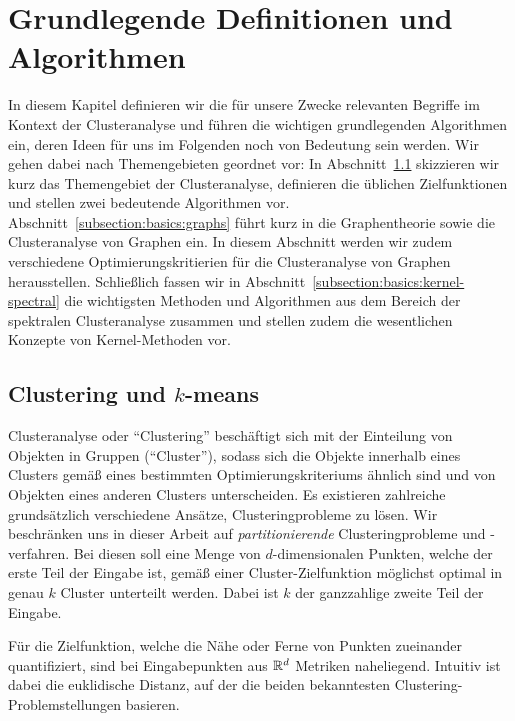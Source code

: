 \section{Grundlegende Definitionen und Algorithmen}
\label{section:basics}

In diesem Kapitel definieren wir die für unsere Zwecke relevanten Begriffe im Kontext der Clusteranalyse und führen die
wichtigen grundlegenden Algorithmen ein, deren Ideen für uns im Folgenden noch von Bedeutung sein werden. Wir gehen dabei
nach Themengebieten geordnet vor: In Abschnitt~\ref{subsection:basics:clustering} skizzieren wir kurz das
Themengebiet der Clusteranalyse, definieren die üblichen Zielfunktionen und stellen zwei bedeutende Algorithmen vor.
Abschnitt~\ref{subsection:basics:graphs} führt kurz in die Graphentheorie sowie die Clusteranalyse von Graphen ein. In diesem
Abschnitt werden wir zudem verschiedene Optimierungskritierien für die
Clusteranalyse von Graphen herausstellen. Schließlich fassen wir in Abschnitt~\ref{subsection:basics:kernel-spectral} die
wichtigsten Methoden und Algorithmen aus dem Bereich der spektralen Clusteranalyse zusammen und stellen zudem die wesentlichen
Konzepte von Kernel-Methoden vor.

\subsection{Clustering und \texorpdfstring{$k$}{k}-means}
\label{subsection:basics:clustering}

Clusteranalyse oder "`Clustering"' beschäftigt sich mit der Einteilung von Objekten in Gruppen ("`Cluster"'), sodass
sich die Objekte innerhalb eines Clusters gemäß eines bestimmten Optimierungskriteriums ähnlich sind und von Objekten eines
anderen Clusters unterscheiden. Es existieren zahlreiche grundsätzlich verschiedene Ansätze, Clusteringprobleme zu lösen.
Wir beschränken uns in dieser Arbeit auf \emph{partitionierende} Clusteringprobleme und -verfahren. Bei diesen
soll eine Menge von $d$-dimensionalen Punkten, welche der erste Teil der Eingabe ist, gemäß einer Cluster-Zielfunktion möglichst
optimal in genau $k$ Cluster unterteilt werden. Dabei ist $k$ der ganzzahlige zweite Teil der Eingabe.

Für die Zielfunktion, welche die Nähe oder Ferne von Punkten zueinander quantifiziert, sind bei Eingabepunkten aus
$\mathbb{R}^{d}$ Metriken naheliegend. Intuitiv ist dabei die euklidische Distanz, auf der die beiden bekanntesten
Clustering-Problemstellungen basieren.

